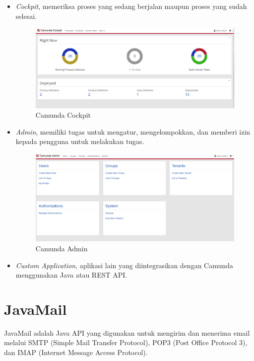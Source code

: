 \begin{itemize}
	

	
	
	\item \textit{Cockpit}, memeriksa proses yang sedang berjalan maupun proses yang sudah selesai.
	\begin{figure}[H]
	\centering
	\includegraphics[scale=0.4]{Gambar/Bab-2/bpms/camundaCockpit}
	\caption{Camunda Cockpit} 
	\label{fig:camundacockpit}
\end{figure}
	
\item \textit{Admin}, memiliki tugas untuk mengatur, mengelompokkan, dan memberi izin kepada pengguna untuk melakukan tugas.
	\begin{figure}[H]
	\centering
	\includegraphics[scale=0.4]{Gambar/Bab-2/bpms/camundaAdmin}
	\caption{Camunda Admin} 
	\label{fig:camundaadmin}
\end{figure}

	\item \textit{Custom Application}, aplikasi lain yang diintegrasikan dengan Camunda menggunakan Java atau REST API.
	
\end{itemize}


\section{JavaMail}
\label{javamail}
JavaMail adalah Java API yang digunakan untuk mengirim dan menerima email melalui SMTP (Simple Mail Transfer Protocol), POP3 (Post Office Protocol 3), dan IMAP (Internet Message Access Protocol). 

